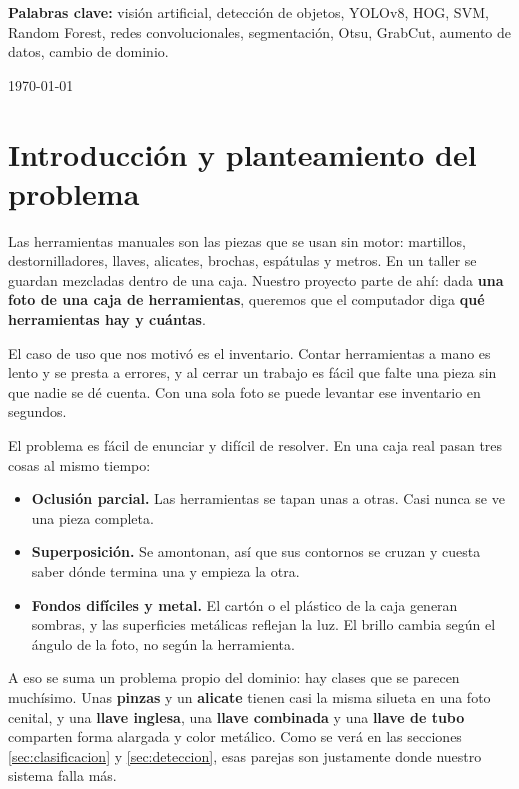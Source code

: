\documentclass[11pt,a4paper]{article}
\begin{document}
\begin{titlepage}
\vspace{1cm}

\begin{minipage}{0.85\textwidth}
\small
\textbf{Palabras clave:} visión artificial, detección de objetos, YOLOv8, HOG, SVM,
Random Forest, redes convolucionales, segmentación, Otsu, GrabCut, aumento de datos,
cambio de dominio.
\end{minipage}

\vfill
{\small \today}
\end{titlepage}

\tableofcontents
\newpage

\section{Introducción y planteamiento del problema}
\label{sec:intro}

Las herramientas manuales son las piezas que se usan sin motor: martillos, destornilladores,
llaves, alicates, brochas, espátulas y metros. En un taller se guardan mezcladas dentro de una
caja. Nuestro proyecto parte de ahí: dada \textbf{una foto de una caja de herramientas},
queremos que el computador diga \textbf{qué herramientas hay y cuántas}.

El caso de uso que nos motivó es el inventario. Contar herramientas a mano es lento y se presta
a errores, y al cerrar un trabajo es fácil que falte una pieza sin que nadie se dé cuenta. Con
una sola foto se puede levantar ese inventario en segundos.

El problema es fácil de enunciar y difícil de resolver. En una caja real pasan tres cosas al
mismo tiempo:

\begin{itemize}
  \item \textbf{Oclusión parcial.} Las herramientas se tapan unas a otras. Casi nunca se ve una
        pieza completa.
  \item \textbf{Superposición.} Se amontonan, así que sus contornos se cruzan y cuesta saber
        dónde termina una y empieza la otra.
  \item \textbf{Fondos difíciles y metal.} El cartón o el plástico de la caja generan sombras, y
        las superficies metálicas reflejan la luz. El brillo cambia según el ángulo de la foto,
        no según la herramienta.
\end{itemize}

A eso se suma un problema propio del dominio: hay clases que se parecen muchísimo. Unas
\textbf{pinzas} y un \textbf{alicate} tienen casi la misma silueta en una foto cenital, y una
\textbf{llave inglesa}, una \textbf{llave combinada} y una \textbf{llave de tubo} comparten forma
alargada y color metálico. Como se verá en las secciones \ref{sec:clasificacion} y
\ref{sec:deteccion}, esas parejas son justamente donde nuestro sistema falla más.
\end{document}
